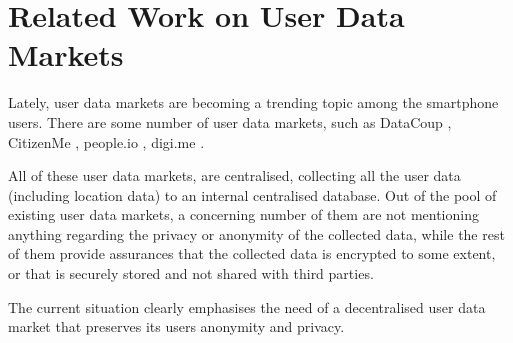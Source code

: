 \section{Related Work on User Data Markets}
Lately, user data markets are becoming a trending topic among the smartphone users. There are some number of user data markets, such as DataCoup \cite{datacoup}, CitizenMe \cite{citizenme}, people.io \cite{peopleio}, digi.me \cite{digime}.

All of these user data markets, are centralised, collecting all the user data (including location data) to an internal centralised database. Out of the pool of existing user data markets, a concerning number of them are not mentioning anything regarding the privacy or anonymity of the collected data, while the rest of them provide assurances that the collected data is encrypted to some extent, or that is securely stored and not shared with third parties.

The current situation clearly emphasises the need of a decentralised user data market that preserves its users anonymity and privacy.

